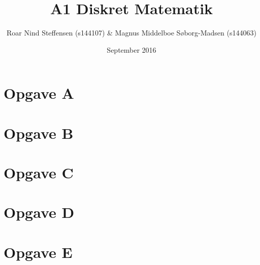 \documentclass{article}
\title{A1 Diskret Matematik}
\author{Roar Nind Steffensen (s144107) & Magnus Middelboe Søborg-Madsen (s144063)}
\date{September 2016}
\numberwithin{figure}{section}
\numberwithin{equation}{section}
\begin{document}
\maketitle
\section{Opgave A}

\newpage


\section{Opgave B}


\section{Opgave C}


\section{Opgave D}


\section{Opgave E}

\end{document}
